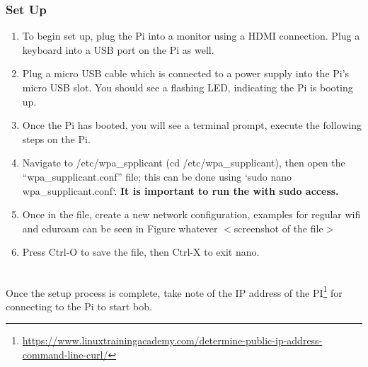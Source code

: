 \documentclass[onecolumn]{IEEEtran}
\begin{document}
\subsubsection{Set Up}
\begin{enumerate}
    \item To begin set up, plug the Pi into a monitor using a HDMI connection. Plug a keyboard into a USB port on the Pi as well. 
    \item Plug a micro USB cable which is connected to a power supply into the Pi’s micro USB  slot. You should see a flashing LED, indicating the  Pi is booting up.
    \item Once the Pi has booted, you will see a terminal prompt, execute the following steps on the Pi.
    \item Navigate to /etc/wpa\_spplicant (cd /etc/wpa\_supplicant), then open the “wpa\_supplicant.conf” file; this can be done using `sudo nano wpa\_supplicant.conf`. \textbf{It is important to run the with sudo access.}
    \item Once in the file, create a new network configuration, examples for regular wifi and eduroam can be seen in Figure whatever $<$screenshot of the file$>$
    \item Press Ctrl-O to save the file, then Ctrl-X to exit nano. 
\end{enumerate}
\  \\
Once the setup process is complete, take note of the IP address of the PI\footnote{\url{https://www.linuxtrainingacademy.com/determine-public-ip-address-command-line-curl/}} for connecting to the Pi to start bob. 
\end{document}
